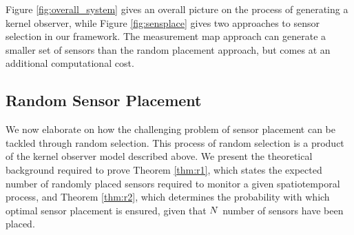 Figure \ref{fig:overall_system} gives an overall picture on the process of generating a kernel observer, while Figure \ref{fig:sensplace} gives two approaches to sensor selection in our framework. The measurement map approach can generate a smaller set of sensors than the random placement approach, but comes at an additional computational cost. 

\subsection{Random Sensor Placement}\label{sec:random_results}
We now elaborate on how the challenging problem of sensor placement can be tackled through random selection. This process of random selection is a product of the kernel observer model described above. We present the theoretical background required to prove Theorem \ref{thm:r1}, which states the expected number of randomly placed sensors required to monitor a given spatiotemporal process, and Theorem \ref{thm:r2}, which determines the probability with which optimal sensor placement is ensured, given that $N$ number of sensors have been placed. 

